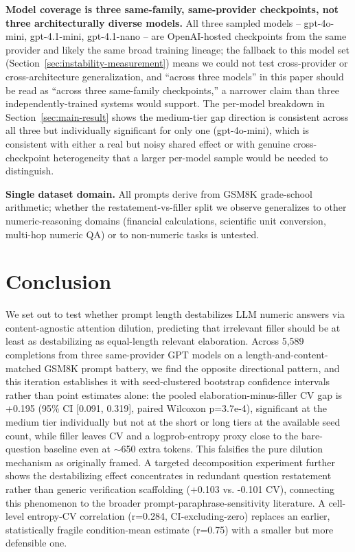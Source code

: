 \documentclass[11pt,letterpaper]{article}
\begin{document}
\textbf{Model coverage is three same-family, same-provider checkpoints, not three architecturally diverse models.} All three sampled models -- gpt-4o-mini, gpt-4.1-mini, gpt-4.1-nano -- are OpenAI-hosted checkpoints from the same provider and likely the same broad training lineage; the fallback to this model set (Section~\ref{sec:instability-measurement}) means we could not test cross-provider or cross-architecture generalization, and ``across three models'' in this paper should be read as ``across three same-family checkpoints,'' a narrower claim than three independently-trained systems would support. The per-model breakdown in Section~\ref{sec:main-result} shows the medium-tier gap direction is consistent across all three but individually significant for only one (gpt-4o-mini), which is consistent with either a real but noisy shared effect or with genuine cross-checkpoint heterogeneity that a larger per-model sample would be needed to distinguish.

\textbf{Single dataset domain.} All prompts derive from GSM8K grade-school arithmetic; whether the restatement-vs-filler split we observe generalizes to other numeric-reasoning domains (financial calculations, scientific unit conversion, multi-hop numeric QA) or to non-numeric tasks is untested.

\section{Conclusion}

We set out to test whether prompt length destabilizes LLM numeric answers via content-agnostic attention dilution, predicting that irrelevant filler should be at least as destabilizing as equal-length relevant elaboration. Across 5,589 completions from three same-provider GPT models on a length-and-content-matched GSM8K prompt battery, we find the opposite directional pattern, and this iteration establishes it with seed-clustered bootstrap confidence intervals rather than point estimates alone: the pooled elaboration-minus-filler CV gap is +0.195 (95\% CI [0.091, 0.319], paired Wilcoxon p=3.7e-4), significant at the medium tier individually but not at the short or long tiers at the available seed count, while filler leaves CV and a logprob-entropy proxy close to the bare-question baseline even at $\sim$650 extra tokens. This falsifies the pure dilution mechanism as originally framed. A targeted decomposition experiment further shows the destabilizing effect concentrates in redundant question restatement rather than generic verification scaffolding (+0.103 vs. -0.101 CV), connecting this phenomenon to the broader prompt-paraphrase-sensitivity literature. A cell-level entropy-CV correlation (r=0.284, CI-excluding-zero) replaces an earlier, statistically fragile condition-mean estimate (r=0.75) with a smaller but more defensible one.
\end{document}
